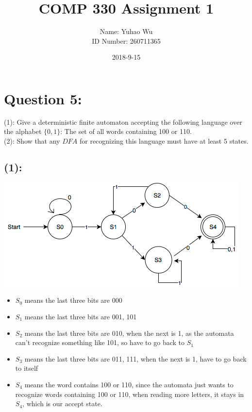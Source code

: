 \documentclass [9 pt]{article}
\theoremstyle{definition}
\begin{document}
\title{COMP 330 Assignment 1}
\date{2018-9-15}
\author{Name: Yuhao Wu\\
ID Number: 260711365
}
\maketitle


\section*{Question 5:}
(1): Give a deterministic finite automaton accepting the following language over the alphabet $\{0, 1\}$: The set of all words containing 100 or 110. \\
\newline
(2): Show that any $DFA$ for recognizing this language must have at least 5 states. 
\subsection*{(1):}
\includegraphics[scale = 0.8]{Q5.png}
\begin{itemize}
	\item $S_0$ means the last three bits are 000
	\item $S_1$ means the last three bits are 001, 101
	\item $S_2$ means the last three bits are 010, when the next is 1, as the automata can't recognize something like 101, so have to go back to $S_1$
	\item $S_3$ means the last three bits are 011, 111, when the next is 1, have to go back to itself
	\item $S_4$ means the word contains 100 or 110, since the automata just wants to recognize words containing 100 or 110, when reading more letters, it stays in $S_4$, which is our accept state.
\end{itemize}
\end{document}
